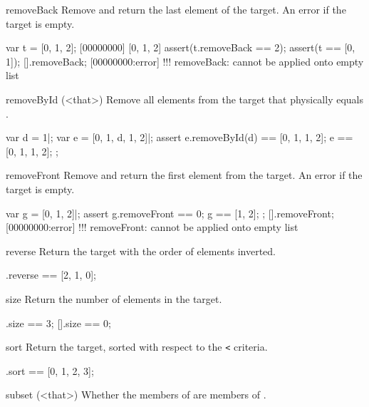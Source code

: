 \begin{urbiscriptapi}
\item[removeBack]
  Remove and return the last element of the target. An error if the
  target is empty.

\begin{urbiscript}
var t = [0, 1, 2];
[00000000] [0, 1, 2]
assert(t.removeBack == 2);
assert(t == [0, 1]);
[].removeBack;
[00000000:error] !!! removeBack: cannot be applied onto empty list
\end{urbiscript}

\item[removeById](<that>)%
  Remove all elements from the target that physically equals
  .

\begin{urbiscript}
var d = 1|;
var e = [0, 1, d, 1, 2]|;
assert
{
  e.removeById(d) == [0, 1, 1, 2];
  e == [0, 1, 1, 2];
};
\end{urbiscript}

\item[removeFront]
Remove and return the first element from the target. An error if the
target is empty.

\begin{urbiscript}
var g = [0, 1, 2]|;
assert
{
  g.removeFront == 0;
  g == [1, 2];
};
[].removeFront;
[00000000:error] !!! removeFront: cannot be applied onto empty list
\end{urbiscript}

\item[reverse]
Return the target with the order of elements inverted.

\begin{urbiassert}
[0, 1, 2].reverse == [2, 1, 0];
\end{urbiassert}

\item[size]
Return the number of elements in the target.

\begin{urbiassert}
[0, 1, 2].size == 3;
[].size == 0;
\end{urbiassert}

\item[sort]
Return the target, sorted with respect to the \lstinline|<| criteria.

\begin{urbiassert}
[1, 0, 3, 2].sort == [0, 1, 2, 3];
\end{urbiassert}

\item[subset](<that>)%
  Whether the members of \this are members of .


\end{urbiscriptapi}
